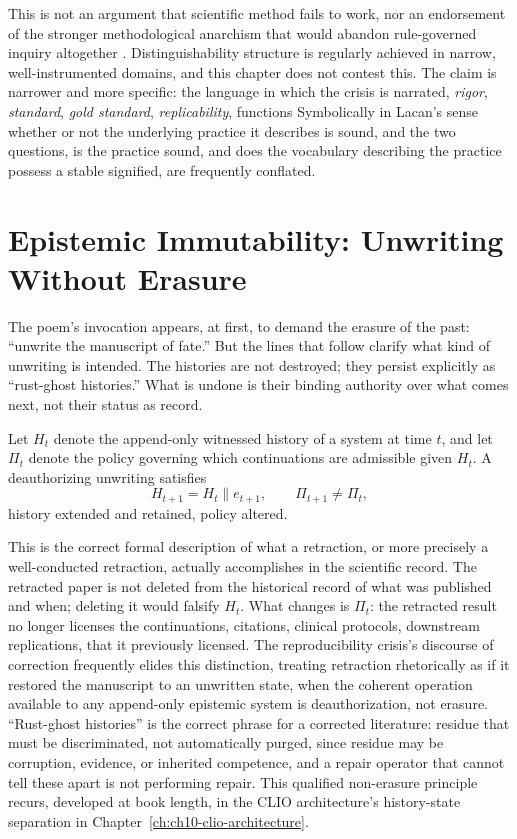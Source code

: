 \begin{remark}
This is not an argument that scientific method fails to work, nor an endorsement of the stronger methodological anarchism that would abandon rule-governed inquiry altogether \cite{feyerabend1975}. Distinguishability structure is regularly achieved in narrow, well-instrumented domains, and this chapter does not contest this. The claim is narrower and more specific: the language in which the crisis is narrated, \emph{rigor}, \emph{standard}, \emph{gold standard}, \emph{replicability}, functions Symbolically in Lacan's sense whether or not the underlying practice it describes is sound, and the two questions, is the practice sound, and does the vocabulary describing the practice possess a stable signified, are frequently conflated.
\end{remark}

\section{Epistemic Immutability: Unwriting Without Erasure}

The poem's invocation appears, at first, to demand the erasure of the past: ``unwrite the manuscript of fate.'' But the lines that follow clarify what kind of unwriting is intended. The histories are not destroyed; they persist explicitly as ``rust-ghost histories.'' What is undone is their binding authority over what comes next, not their status as record.

\begin{definition}
Let $H_t$ denote the append-only witnessed history of a system at time $t$, and let $\Pi_t$ denote the policy governing which continuations are admissible given $H_t$. A deauthorizing unwriting satisfies
\[
H_{t+1} = H_t \parallel e_{t+1}, \qquad \Pi_{t+1} \neq \Pi_t,
\]
history extended and retained, policy altered.
\end{definition}

This is the correct formal description of what a retraction, or more precisely a well-conducted retraction, actually accomplishes in the scientific record. The retracted paper is not deleted from the historical record of what was published and when; deleting it would falsify $H_t$. What changes is $\Pi_t$: the retracted result no longer licenses the continuations, citations, clinical protocols, downstream replications, that it previously licensed. The reproducibility crisis's discourse of correction frequently elides this distinction, treating retraction rhetorically as if it restored the manuscript to an unwritten state, when the coherent operation available to any append-only epistemic system is deauthorization, not erasure. ``Rust-ghost histories'' is the correct phrase for a corrected literature: residue that must be discriminated, not automatically purged, since residue may be corruption, evidence, or inherited competence, and a repair operator that cannot tell these apart is not performing repair. This qualified non-erasure principle recurs, developed at book length, in the CLIO architecture's history-state separation in Chapter~\ref{ch:ch10-clio-architecture}.

